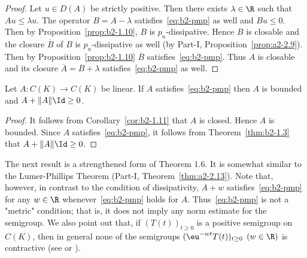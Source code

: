 \begin{proof}%
Let $u \in D(A)$ be strictly positive.
Then there exists $\lambda \in \R$ such that $Au \leq \lambda u$.
The operator $B = A - \lambda$ satisfies~\eqref{eq:b2-pmp} as well and $Bu \leq 0$.
Then by Proposition~\ref{prop:b2-1.10}, $B$ is $p_{u}$-dissipative.
Hence $B$ is closable and the closure $\overline{B}$ of\/ $B$ is $p_{u}$-dissipative as well (by Part-I, Proposition~\ref{prop:a2-2.9}).
Then by Proposition~\ref{prop:b2-1.10} $\overline{B}$ satisfies~\eqref{eq:b2-pmp}.
Thus $A$ is closable and its closure $\overline{A} = \overline{B} + \lambda$ satisfies~\eqref{eq:b2-pmp} as well.
\end{proof}
\begin{corollary}\label{cor:b2-1.12}
Let $A \colon C(K) \to C(K)$ be linear.
If\/ $A$ satisfies~\eqref{eq:b2-pmp} then $A$ is bounded and $A + \|A\|\Id \geq 0$.
\end{corollary}
\begin{proof}
It follows from Corollary~\ref{cor:b2-1.11} that $A$ is closed.
Hence $A$ is bounded.
Since $A$ satisfies~\eqref{eq:b2-pmp}, it follows from Theorem~\ref{thm:b2-1.3} that $A + \|A\|\Id \geq 0$.
\end{proof}
The next result is a strengthened form of Theorem 1.6.
It is somewhat similar to the Lumer-Phillips Theorem (Part-I, Theorem~\ref{thm:a2-2.13}).
Note that, however, in contrast to the condition of dissipativity, $A + w$ satisfies~\eqref{eq:b2-pmp} for any $w \in \R$ whenever~\eqref{eq:b2-pmp} holds for $A$.
Thus~\eqref{eq:b2-pmp} is not a "metric" condition; that is, it does not imply any norm estimate for the semigroup.
We also point out that, if\/ $(T(t))_{t \geq 0}$ is a positive semigroup on $C(K)$, then in general none of the semigroups $(\eu^{-wt}T(t))_{t \geq 0}$ $(w \in \R)$ is contractive (see \textcite{battydavies:1983} or \textcite{derndinger:1983}).

